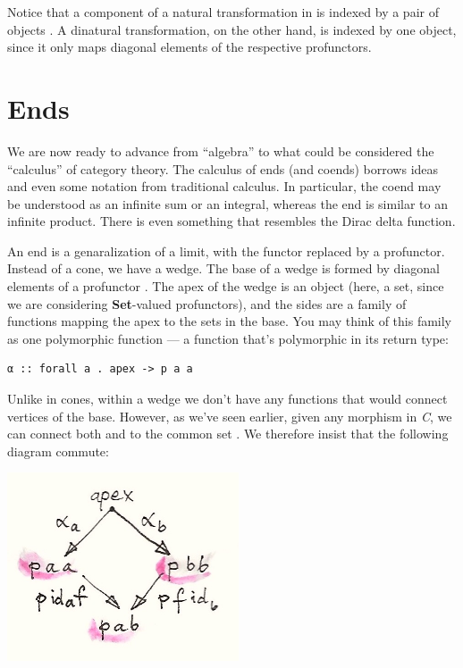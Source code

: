 Notice that a component of a natural transformation  in
 is indexed by a pair of objects
. A dinatural transformation, on the other hand, is
indexed by one object, since it only maps diagonal elements of the
respective profunctors.

\section{Ends}\label{ends}

We are now ready to advance from ``algebra'' to what could be considered
the ``calculus'' of category theory. The calculus of ends (and coends)
borrows ideas and even some notation from traditional calculus. In
particular, the coend may be understood as an infinite sum or an
integral, whereas the end is similar to an infinite product. There is
even something that resembles the Dirac delta function.

An end is a genaralization of a limit, with the functor replaced by a
profunctor. Instead of a cone, we have a wedge. The base of a wedge is
formed by diagonal elements of a profunctor . The apex of the
wedge is an object (here, a set, since we are considering
\textbf{Set}-valued profunctors), and the sides are a family of
functions mapping the apex to the sets in the base. You may think of
this family as one polymorphic function --- a function that's
polymorphic in its return type:

\begin{verbatim}
α :: forall a . apex -> p a a
\end{verbatim}

Unlike in cones, within a wedge we don't have any functions that would
connect vertices of the base. However, as we've seen earlier, given any
morphism  in \emph{C}, we can connect both
 and  to the common set
. We therefore insist that the following diagram
commute:

\includegraphics[width=2.69792in]{images/end-2.jpg}

